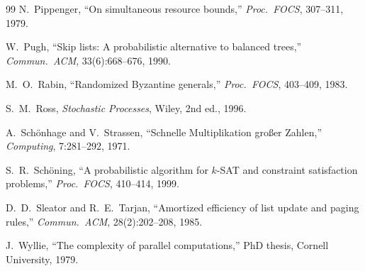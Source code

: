 \documentclass[twoside,12pt]{book}
\theoremstyle{plain}
\theoremstyle{definition}
\theoremstyle{remark}
\begin{document}
\begin{thebibliography}{99}
N.~Pippenger,
``On simultaneous resource bounds,''
\textit{Proc.~FOCS}, 307--311, 1979.

W.~Pugh,
``Skip lists: A probabilistic alternative to balanced trees,''
\textit{Commun.~ACM}, 33(6):668--676, 1990.

M.~O.~Rabin,
``Randomized Byzantine generals,''
\textit{Proc.~FOCS}, 403--409, 1983.

S.~M.~Ross,
\textit{Stochastic Processes},
Wiley, 2nd ed., 1996.

A.~Sch\"{o}nhage and V.~Strassen,
``Schnelle Multiplikation gro{\ss}er Zahlen,''
\textit{Computing}, 7:281--292, 1971.

S.~R.~Sch\"{o}ning,
``A probabilistic algorithm for $k$-SAT and constraint satisfaction problems,''
\textit{Proc.~FOCS}, 410--414, 1999.

D.~D.~Sleator and R.~E.~Tarjan,
``Amortized efficiency of list update and paging rules,''
\textit{Commun.~ACM}, 28(2):202--208, 1985.

J.~Wyllie,
``The complexity of parallel computations,''
PhD thesis, Cornell University, 1979.

\end{thebibliography}

\end{document}
